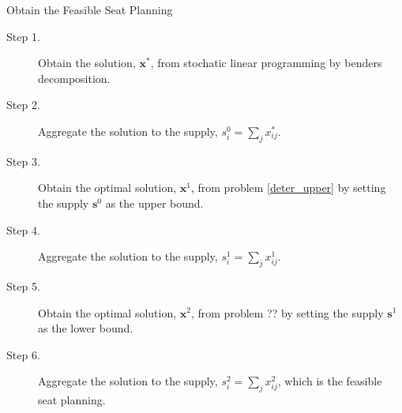 \begin{frame}{Obtain the Feasible Seat Planning}
      \begin{description}
      \item[Step 1.] Obtain the solution, $\mathbf{x}^{*}$, from stochatic linear programming by benders decomposition.
  
      \item[Step 2.] Aggregate the solution to the supply, ${s}_{i}^{0} = \sum_{j} x^{*}_{ij}$.
  
      \item[Step 3.] Obtain the optimal solution, $\mathbf{x}^{1}$, from problem \eqref{deter_upper} by setting the supply $\mathbf{s}^{0}$ as the upper bound. 
      
      \item[Step 4.] Aggregate the solution to the supply, ${s}_{i}^{1} = \sum_{j} x^{1}_{ij}$.
  
      \item[Step 5.] Obtain the optimal solution, $\mathbf{x}^{2}$, from problem ?? by setting the supply $\mathbf{s}^{1}$ as the lower bound. 
      \item[Step 6.] Aggregate the solution to the supply, ${s}_{i}^{2} = \sum_{j} x^{2}_{ij}$, which is the feasible seat planning.
     \end{description}
\end{frame}